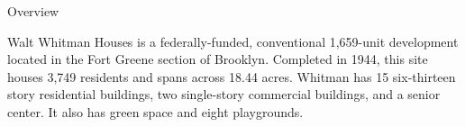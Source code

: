 Overview

 Walt Whitman Houses is a federally-funded, conventional 1,659-unit development located in the Fort Greene section of Brooklyn. Completed in 1944, this site houses 3,749 residents and spans across 18.44 acres. Whitman has 15 six-thirteen story residential buildings, two single-story commercial buildings, and a senior center. It also has green space and eight playgrounds. 